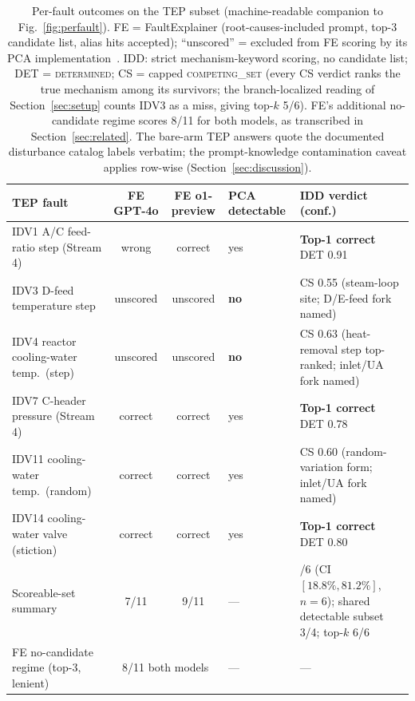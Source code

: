 \documentclass[preprint,12pt]{elsarticle}
\begin{document}
\begin{table}[!t]
\caption{Per-fault outcomes on the TEP subset (machine-readable companion to Fig.~\ref{fig:perfault}). FE = FaultExplainer (root-causes-included prompt, top-3 candidate list, alias hits accepted); ``unscored'' = excluded from FE scoring by its PCA implementation~\cite{chiang2001fault}. IDD: strict mechanism-keyword scoring, no candidate list; DET = \mbox{\textsc{determined}}; CS = capped \mbox{\textsc{competing\_set}} (every CS verdict ranks the true mechanism among its survivors; the branch-localized reading of Section~\ref{sec:setup} counts IDV3 as a miss, giving top-$k$ 5/6). FE's additional no-candidate regime scores 8/11 for both models, as transcribed in Section~\ref{sec:related}. The bare-arm TEP answers quote the documented disturbance catalog labels verbatim; the prompt-knowledge contamination caveat applies row-wise (Section~\ref{sec:discussion}).}
\label{tab:perfault}
\centering
\footnotesize\setlength{\tabcolsep}{2.5pt}\renewcommand{\arraystretch}{1.06}
\begin{tabular}{@{}>{\raggedright\arraybackslash}p{2.9cm}cc>{\raggedright\arraybackslash}p{1.5cm}>{\raggedright\arraybackslash}p{3.5cm}@{}}
\toprule
TEP fault & FE GPT-4o & FE o1-preview & PCA detectable & IDD verdict (conf.) \\
\midrule
IDV1 A/C feed-ratio step (Stream 4) & wrong & correct & yes & \textbf{Top-1 correct} DET 0.91 \\
IDV3 D-feed temperature step & unscored & unscored & \textbf{no} & CS 0.55 (steam-loop site; D/E-feed fork named) \\
IDV4 reactor cooling-water temp.\ (step) & unscored & unscored & \textbf{no} & CS 0.63 (heat-removal step top-ranked; inlet/UA fork named) \\
IDV7 C-header pressure (Stream 4) & correct & correct & yes & \textbf{Top-1 correct} DET 0.78 \\
IDV11 cooling-water temp.\ (random) & correct & correct & yes & CS 0.60 (random-variation form; inlet/UA fork named) \\
IDV14 cooling-water valve (stiction) & correct & correct & yes & \textbf{Top-1 correct} DET 0.80 \\
\midrule
Scoreable-set summary & 7/11 & 9/11 &---& 3/6 (CI $[18.8\%,81.2\%]$, $n{=}6$); shared detectable subset 3/4; top-$k$ 6/6 \\
\midrule
FE no-candidate regime (top-3, lenient) & \multicolumn{2}{c}{8/11 both models} &---&---\\
\bottomrule
\end{tabular}
\end{table}
\end{document}
